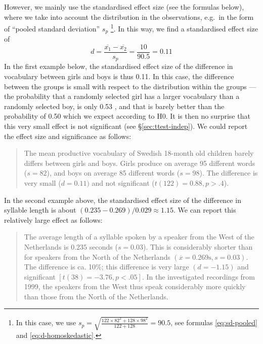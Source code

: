 \documentclass[
]{book}
\begin{document}
However, we mainly use the standardised effect size (see
the formulas below), where we take into account the distribution in
the observations, e.g.~in the form of ``pooled standard deviation'' \(s_p\) \footnote{In this case, we use \(s_p = \sqrt{ \frac{122\times82^2+128\times98^2} {122+128} } = 90.5\), see formulas
  \eqref{eq:sd-pooled} and \eqref{eq:d-homoskedastic}.}.
In this way, we find a standardised effect size of
\begin{equation}
  \label{eq:d-standardized}
    d = \frac{ \overline{x_1}-\overline{x_2} } {s_p} = \frac{10}{90.5} = 0.11
\end{equation}
In the first example below, the standardised effect size of the difference in
vocabulary between girls and boys is thus 0.11. In this case, the difference
between the groups is small with respect to the distribution
within the groups --- the probability that a randomly selected girl
has a larger vocabulary than a randomly selected boy, is only 0.53 \citep{McGraw92},
and that is barely better than the probability of 0.50 which we expect according to H0.
It is then no surprise that this very small effect is not significant
(see §\ref{sec:ttest-indep}). We could
report the effect size and significance as follows:

\begin{quote}
The mean productive vocabulary of Swedish 18-month old children
barely differs between girls and boys. Girls
produce on average 95 different words (\(s=82\)), and boys
on average 85 different words (\(s=98\)). The difference is very
small (\(d=0.11)\) and not significant (\(t(122)=0.88, p>.4\)).
\end{quote}

In the second example above, the standardised effect size of the difference
in syllable length is about
\((0.235-0.269)/0.029 \approx 1.15\). We can report this relatively large
effect as follows:

\begin{quote}
The average length of a syllable spoken by a speaker from
the West of the Netherlands is \(0.235\) seconds (\(s=0.03\)). This is
considerably shorter than for speakers from the North of the Netherlands
\((\overline{x}=0.269 \textrm{s}, s=0.03)\). The difference is ca. 10\%; this
difference is very large \((d=-1.15)\) and significant
\([t(38)=-3.76, p<.05]\). In the investigated recordings from 1999, the
speakers from the West thus speak considerably more quickly than those from
the North of the Netherlands.
\end{quote}
\end{document}
